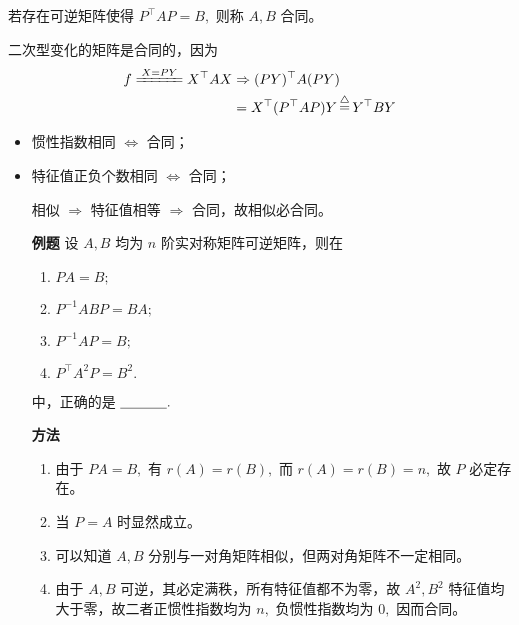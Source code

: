 

若存在可逆矩阵使得 $ P^\top AP = B, $ 则称 $ A,B $ 合同。

二次型变化的矩阵是合同的，因为
\begin{equation*}
    \begin{aligned}
        f\xlongequal{X = PY}X^\top AX &\Rightarrow (PY)^\top A(PY)
        \\ &= X^\top(P^\top AP)Y \whichis Y^\top BY
    \end{aligned}
\end{equation*} 


\begin{itemize}
    \item 惯性指数相同 $ \Leftrightarrow $ 合同；
    \item 特征值正负个数相同 $ \Leftrightarrow $ 合同；
    
    相似 $ \Rightarrow $ 特征值相等 $ \Rightarrow $ 合同，故相似必合同。
\end{itemize}

\begin{itemize}
    \item[\textbf{例题}] 设 $ A,B $ 均为 $ n $ 阶实对称矩阵可逆矩阵，则在
    \begin{enumerate}[label = \Alph*)]
        \item $ PA = B; $ 
        \item $ P^{-1}ABP=BA; $ 
        \item $ P^{-1}AP = B; $ 
        \item $ P^\top A^2P = B^2. $ 
    \end{enumerate}
    中，正确的是 $ \underline{~~~~~~~~~~}. $ 
    \item[\textbf{方法}] 
    \begin{enumerate}[label = \Alph*)]
        \item 由于 $ PA = B, $ 有 $ r(A) = r(B), $ 而 $ r(A) = r(B) = n, $ 故
        $ P $ 必定存在。
        \item 当 $ P = A $ 时显然成立。
        \item 可以知道 $ A,B $ 分别与一对角矩阵相似，但两对角矩阵不一定相同。
        \item 由于 $ A,B $ 可逆，其必定满秩，所有特征值都不为零，故
        $ A^2,B^2 $ 特征值均大于零，故二者正惯性指数均为 $ n, $ 负惯性指数均为 $ 0,
         $ 因而合同。
    \end{enumerate}
\end{itemize}

